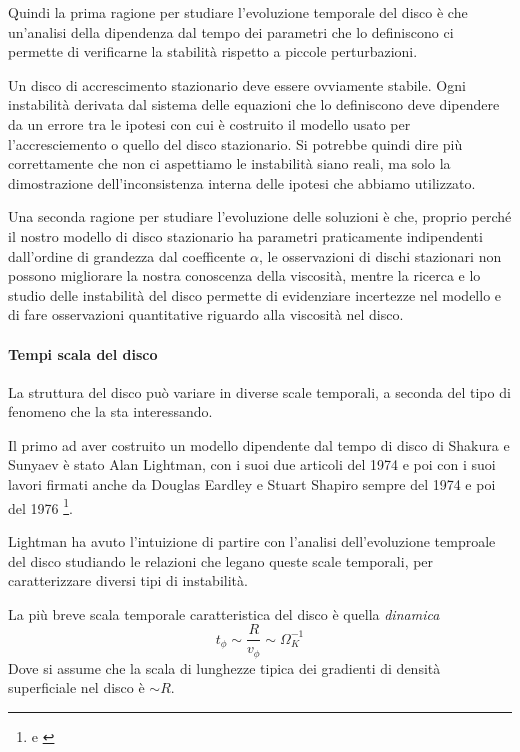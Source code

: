 \documentclass[a4paperbi]{article}
\begin{document}
	Quindi la prima ragione per studiare l'evoluzione temporale del disco è che un'analisi della dipendenza dal tempo dei parametri che lo definiscono ci permette di verificarne la stabilità rispetto a piccole perturbazioni. 
	
	Un disco di accrescimento stazionario deve essere ovviamente stabile. Ogni instabilità derivata dal sistema delle equazioni che lo definiscono deve dipendere da un errore tra le ipotesi con cui è costruito il modello usato per l'accresciemento o quello del disco stazionario. Si potrebbe quindi dire più correttamente che non ci aspettiamo le instabilità siano reali, ma solo la dimostrazione dell'inconsistenza interna delle ipotesi che abbiamo utilizzato.
	
	Una seconda ragione per studiare l'evoluzione delle soluzioni è che, proprio perché il nostro modello di disco stazionario ha parametri praticamente indipendenti dall'ordine di grandezza dal coefficente $\alpha$, le osservazioni di dischi stazionari non possono migliorare la nostra conoscenza della viscosità, mentre la ricerca e lo studio delle instabilità del disco permette di evidenziare incertezze nel modello e di fare osservazioni quantitative riguardo alla viscosità nel disco.
	
	\paragraph{Tempi scala del disco}	
	La struttura del disco può variare in diverse scale temporali, a seconda del tipo di fenomeno che la sta interessando. 	
	
	Il primo ad aver costruito un modello dipendente dal tempo di disco di Shakura e Sunyaev è stato Alan Lightman, con i suoi due articoli del 1974 e poi con i suoi lavori firmati anche da Douglas Eardley e Stuart Shapiro sempre del 1974 e poi del 1976 \footnote{\cite{LightmanEardley1974} e \cite{ShapiroLightmanEardley1976}}. 
	
	Lightman ha avuto l'intuizione di partire con l'analisi dell'evoluzione temproale del disco studiando le relazioni che legano queste scale temporali, per caratterizzare diversi tipi di instabilità.	
	
	La più breve scala temporale caratteristica del disco è quella \textit{dinamica}
	\begin{equation}
		t_\phi\sim\frac{R}{v_\phi}\sim\Omega_K^{-1}
	\end{equation}
	Dove si assume che la scala di lunghezze tipica dei gradienti di densità superficiale nel disco è $\sim R$.
	
\end{document}

